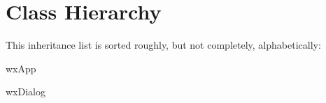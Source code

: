 \section{Class Hierarchy}
This inheritance list is sorted roughly, but not completely, alphabetically\+:\begin{DoxyCompactList}
\item {}
\begin{DoxyCompactList}
\item {}
\end{DoxyCompactList}
\item {}
\item {}
\begin{DoxyCompactList}
\item {}
\end{DoxyCompactList}
\item wx\+App\begin{DoxyCompactList}
\item {}
\end{DoxyCompactList}
\item wx\+Dialog\begin{DoxyCompactList}
\item {}
\begin{DoxyCompactList}
\item {}
\end{DoxyCompactList}
\end{DoxyCompactList}
\end{DoxyCompactList}
